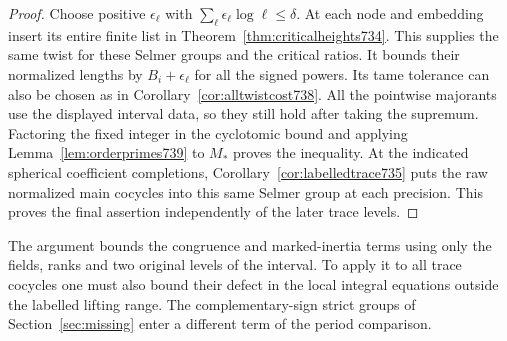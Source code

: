 \documentclass[a4paper,11pt]{article}
\theoremstyle{definition}
\theoremstyle{remark}
\numberwithin{equation}{section}
\begin{document}
\begin{proof}
Choose positive \(\epsilon_\ell\) with
\(\sum_\ell\epsilon_\ell\log\ell\le\delta\). At each node and
embedding insert its entire finite list in
Theorem~\ref{thm:criticalheights734}. This supplies the same
twist for these Selmer groups and the critical ratios. It
bounds their normalized lengths by \(B_i+\epsilon_\ell\)
for all the signed powers. Its tame tolerance can also be
chosen as in Corollary~\ref{cor:alltwistcost738}. All the
pointwise majorants use the displayed interval data, so they
still hold after taking the supremum. Factoring the fixed
integer in the cyclotomic bound and applying
Lemma~\ref{lem:orderprimes739} to \(M_*\) proves the inequality.
At the indicated spherical coefficient completions,
Corollary~\ref{cor:labelledtrace735} puts the raw normalized
main cocycles into this same Selmer group at each precision.
This proves the final assertion independently of the later
trace levels.
\end{proof}

The argument bounds the congruence and marked-inertia terms
using only the fields, ranks and two original levels of the
interval. To apply it to all trace cocycles one must also bound
their defect in the local integral equations outside the labelled
lifting range. The complementary-sign strict groups of
Section~\ref{sec:missing} enter a different term of the period
comparison.
\clearpage

\clearpage
\end{document}
